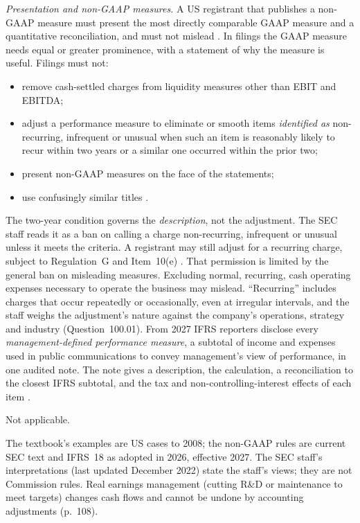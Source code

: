 \begin{qfmethod}
\emph{Presentation and non-GAAP measures.} A US registrant that publishes a non-GAAP measure must present the most directly comparable GAAP measure and a quantitative reconciliation, and must not mislead \citep[paras.~(a)--(b)]{sec-regulation-g}. In filings the GAAP measure needs equal or greater prominence, with a statement of why the measure is useful. Filings must not:
\begin{itemize}
\item remove cash-settled charges from liquidity measures other than EBIT and EBITDA;
\item adjust a performance measure to eliminate or smooth items \emph{identified as} non-recurring, infrequent or unusual when such an item is reasonably likely to recur within two years or a similar one occurred within the prior two;
\item present non-GAAP measures on the face of the statements;
\item use confusingly similar titles \citep[para.~(e)(1)]{sec-sk-item-10e}.
\end{itemize}
The two-year condition governs the \emph{description}, not the adjustment. The SEC staff reads it as a ban on calling a charge non-recurring, infrequent or unusual unless it meets the criteria. A registrant may still adjust for a recurring charge, subject to Regulation~G and Item~10(e) \citep[Question~102.03]{sec-non-gaap-cdi-2022}. That permission is limited by the general ban on misleading measures. Excluding normal, recurring, cash operating expenses necessary to operate the business may mislead. ``Recurring'' includes charges that occur repeatedly or occasionally, even at irregular intervals, and the staff weighs the adjustment's nature against the company's operations, strategy and industry (Question~100.01).
From 2027 IFRS reporters disclose every \emph{management-defined performance measure}, a subtotal of income and expenses used in public communications to convey management's view of performance, in one audited note. The note gives a description, the calculation, a reconciliation to the closest IFRS subtotal, and the tax and non-controlling-interest effects of each item \citep[Annex, IFRS~18 paras.~117--118 and~121--123]{eu-2026-338-ifrs18}.

 Not applicable.

 The textbook's examples are US cases to 2008; the non-GAAP rules are current SEC text and IFRS~18 as adopted in 2026, effective 2027. The SEC staff's interpretations (last updated December 2022) state the staff's views; they are not Commission rules. Real earnings management (cutting R\&D or maintenance to meet targets) changes cash flows and cannot be undone by accounting adjustments (p.~108).


\end{qfmethod}
